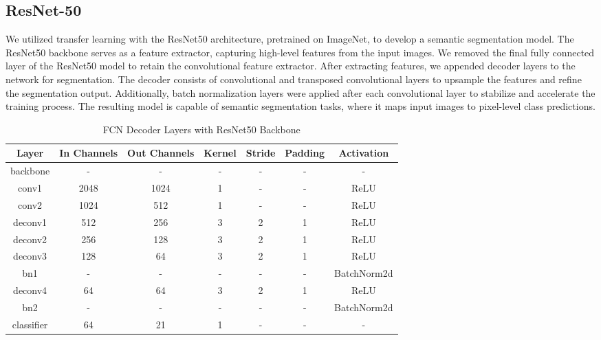 \documentclass{article}
\begin{document}
\subsection{ResNet-50}
We utilized transfer learning with the ResNet50 architecture, pretrained on ImageNet, to develop a semantic segmentation model. The ResNet50 backbone serves as a feature extractor, capturing high-level features from the input images. We removed the final fully connected layer of the ResNet50 model to retain the convolutional feature extractor. After extracting features, we appended decoder layers to the network for segmentation. The decoder consists of convolutional and transposed convolutional layers to upsample the features and refine the segmentation output. Additionally, batch normalization layers were applied after each convolutional layer to stabilize and accelerate the training process. The resulting model is capable of semantic segmentation tasks, where it maps input images to pixel-level class predictions.

\begin{table}[h]
  \centering
  \renewcommand{\arraystretch}{1.5}
  \begin{tabular}{|c|c|c|c|c|c|c|}
    \hline
    Layer      & In Channels & Out Channels & Kernel & Stride & Padding & Activation 
    \\\hline
    backbone   & -           & -            & -      & -      & -       & - \\\hline
    conv1      & 2048        & 1024         & 1      & -      & -       & ReLU \\\hline
    conv2      & 1024        & 512          & 1      & -      & -       & ReLU \\\hline
    deconv1    & 512         & 256          & 3      & 2      & 1       & ReLU \\\hline
    deconv2    & 256         & 128          & 3      & 2      & 1       & ReLU \\\hline
    deconv3    & 128         & 64           & 3      & 2      & 1       & ReLU \\\hline
    bn1        & -           & -            & -      & -      & -       & BatchNorm2d \\\hline
    deconv4    & 64          & 64           & 3      & 2      & 1       & ReLU \\\hline
    bn2        & -           & -            & -      & -      & -       & BatchNorm2d \\\hline
    classifier & 64          & 21           & 1      & -      & -       & - 
    \\\hline
  \end{tabular}
  \caption{FCN Decoder Layers with ResNet50 Backbone}
  \label{tab:fcn_decoder_layers_resnet50}
\end{table}
\end{document}
